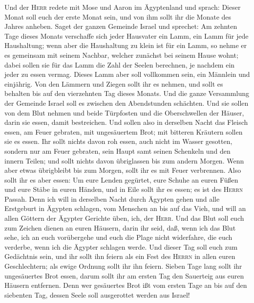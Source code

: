  Und der \textsc{Herr} redete mit Mose und Aaron im
Ägyptenland und sprach:  Dieser Monat soll euch der erste
Monat sein, und von ihm sollt ihr die Monate des Jahres anheben.
 Saget der ganzen Gemeinde Israel und sprechet: Am zehnten
Tage dieses Monats verschaffe sich jeder Hausvater ein Lamm, ein Lamm
für jede Haushaltung;  wenn aber die Haushaltung zu klein
ist für ein Lamm, so nehme er es gemeinsam mit seinem Nachbar, welcher
zunächst bei seinem Hause wohnt; dabei sollen sie für das Lamm die Zahl
der Seelen berechnen, je nachdem ein jeder zu essen vermag.
 Dieses Lamm aber soll vollkommen sein, ein Männlein und
einjährig. Von den Lämmern und Ziegen sollt ihr es nehmen,
 und sollt es behalten bis auf den vierzehnten Tag dieses
Monats. Und die ganze Versammlung der Gemeinde Israel soll es zwischen
den Abendstunden schächten.  Und sie sollen von dem Blut
nehmen und beide Türpfosten und die Oberschwellen der Häuser, darin sie
essen, damit bestreichen.  Und sollen also in derselben
Nacht das Fleisch essen, am Feuer gebraten, mit ungesäuertem Brot; mit
bitteren Kräutern sollen sie es essen.  Ihr sollt nichts
davon roh essen, auch nicht im Wasser gesotten, sondern nur am Feuer
gebraten, sein Haupt samt seinen Schenkeln und den innern Teilen;
 und sollt nichts davon übriglassen bis zum andern
Morgen. Wenn aber etwas übrigbleibt bis zum Morgen, sollt ihr es mit
Feuer verbrennen.  Also sollt ihr es aber essen: Um eure
Lenden gegürtet, eure Schuhe an euren Füßen und eure Stäbe in euren
Händen, und in Eile sollt ihr es essen; es ist des \textsc{Herrn}
Passah.  Denn ich will in derselben Nacht durch Ägypten
gehen und alle Erstgeburt in Ägypten schlagen, vom Menschen an bis auf
das Vieh, und will an allen Göttern der Ägypter Gerichte üben, ich, der
\textsc{Herr}.  Und das Blut soll euch zum Zeichen dienen
an euren Häusern, darin ihr seid, daß, wenn ich das Blut sehe, ich an
euch vorübergehe und euch die Plage nicht widerfahre, die euch verderbe,
wenn ich die Ägypter schlagen werde.  Und dieser Tag soll
euch zum Gedächtnis sein, und ihr sollt ihn feiern als ein Fest des
\textsc{Herrn} in allen euren Geschlechtern; als ewige Ordnung sollt ihr
ihn feiern.  Sieben Tage lang sollt ihr ungesäuertes Brot
essen, darum sollt ihr am ersten Tag den Sauerteig aus euren Häusern
entfernen. Denn wer gesäuertes Brot ißt vom ersten Tage an bis auf den
siebenten Tag, dessen Seele soll ausgerottet werden aus Israel!
